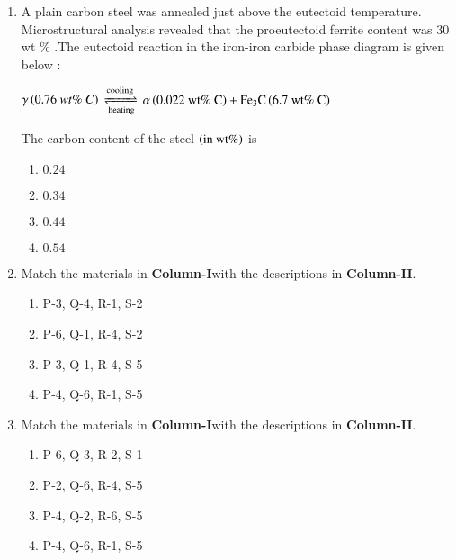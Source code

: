 \documentclass[journal]{IEEEtran}
\begin{document}
\begin{enumerate}


\item A plain carbon steel was annealed just above the eutectoid temperature. Microstructural analysis revealed that the proeutectoid ferrite content was 30 wt \% .The eutectoid reaction in the iron-iron carbide phase diagram is given below :

\begin{center}
    $\gamma\left(0.76\ wt\% \ C\right)$ $\xrightleftharpoons[\text{heating}]{\text{cooling}}$ 
    $\alpha\left(0.022\ \text{wt}\%\ \text{C}\right) + \text{Fe}  _3\text{C} \left(6.7\ \text{wt}\% \ \text{C} \right)$
\end{center} 

The carbon content of the steel $\left(\text{in wt}\%\right)$ is
\begin{multicols}{4}
\begin{enumerate}
    \item $0.24$
    \item $0.34$
    \item $0.44$
    \item $0.54$
\end{enumerate}
\end{multicols}

\item Match the materials in \textbf{Column-I}with the descriptions in \textbf{Column-II}.
\begin{table}[h]
    \centering
    
    \label{tab:my_label}
\end{table}
\begin{multicols}{2}
\begin{enumerate}
    \item P-3, Q-4, R-1, S-2
    \item P-6, Q-1, R-4, S-2
    \item P-3, Q-1, R-4, S-5
    \item P-4, Q-6, R-1, S-5
\end{enumerate}
\end{multicols}

\item Match the materials in \textbf{Column-I}with the descriptions in \textbf{Column-II}.
\begin{table}[h]
    \centering
    
    \label{tab:my_label}
\end{table}
\begin{multicols}{2}
\begin{enumerate}
    \item P-6, Q-3, R-2, S-1
    \item P-2, Q-6, R-4, S-5
    \item P-4, Q-2, R-6, S-5
    \item P-4, Q-6, R-1, S-5
\end{enumerate}
\end{multicols}


\end{enumerate}
\end{document}
